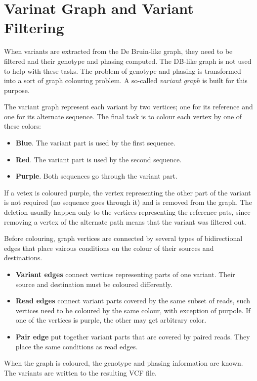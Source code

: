 \section{Varinat Graph and Variant Filtering}
\label{sec:variant-graph-and-variant-filtering}

When variants are extracted from the De Bruin-like graph, they need to be filtered and their genotype and phasing computed. The DB-like graph is not used to help with these tasks. The problem of genotype and phasing is transformed into a sort of graph colouring problem. A so-called \textit{variant graph} is built for this purpose.

The variant graph represent each variant by two vertices; one for its reference and one for its alternate sequence. The final task is to colour each vertex by one of these colors:
\begin{itemize}
\item \textbf{Blue}. The variant part is used by the first sequence.
\item \textbf{Red}. The variant part is used by the second sequence.
\item \textbf{Purple}. Both sequences go through the variant part.
\end{itemize}

If a vetex is coloured purple, the vertex representing the other part of the variant is not required (no sequence goes through it) and is removed from the graph. The deletion usually happen only to the vertices representing the reference pats, since removing a vertex of the alternate path means that the variant was filtered out.

Before colouring, graph vertices are connected by several types of bidirectional edges that place vairous conditions on the colour of their sources and destinations.
\begin{itemize}
\item \textbf{Variant edges} connect vertices representing parts of one variant. Their source and destination must be coloured differently.
\item \textbf{Read edges} connect variant parts covered by the same subset of reads, such vertices need to be coloured by the same colour, with exception of purpole. If one of the vertices is purple, the other may get arbitrary color.
\item \textbf{Pair edge} put together variant parts that are covered by paired reads. They place the same conditions as read edges.
\end{itemize}

When the graph is coloured, the genotype and phasing information are known. The variants are written to the resulting VCF file.
